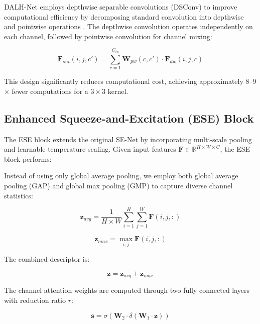 \documentclass[default, iicol]{sn-jnl}
\theoremstyle{thmstyleone}%
\theoremstyle{thmstyletwo}%
\theoremstyle{thmstylethree}%
\begin{document}
DALH-Net employs depthwise separable convolutions (DSConv) to improve computational efficiency by decomposing standard convolution into depthwise and pointwise operations \cite{chollet2017xception}. The depthwise convolution operates independently on each channel, followed by pointwise convolution for channel mixing:

\begin{equation}
\mathbf{F}_{out}(i,j,c') = \sum_{c=1}^{C_{in}} \mathbf{W}_{pw}(c,c') \cdot \mathbf{F}_{dw}(i,j,c)
\end{equation}

This design significantly reduces computational cost, achieving approximately 8--9$\times$ fewer computations for a $3 \times 3$ kernel.


\subsection{Enhanced Squeeze-and-Excitation (ESE) Block}

The ESE block extends the original SE-Net \cite{hu2018squeeze} by incorporating multi-scale pooling and learnable temperature scaling. Given input features $\mathbf{F} \in \mathbb{R}^{H \times W \times C}$, the ESE block performs:

Instead of using only global average pooling, we employ both global average pooling (GAP) and global max pooling (GMP) to capture diverse channel statistics:

\begin{equation}
\mathbf{z}_{avg} = \frac{1}{H \times W} \sum_{i=1}^{H}\sum_{j=1}^{W} \mathbf{F}(i,j,:)
\label{eq:gap}
\end{equation}

\begin{equation}
\mathbf{z}_{max} = \max_{i,j} \mathbf{F}(i,j,:)
\label{eq:gmp}
\end{equation}

The combined descriptor is:

\begin{equation}
\mathbf{z} = \mathbf{z}_{avg} + \mathbf{z}_{max}
\label{eq:combined_pool}
\end{equation}


The channel attention weights are computed through two fully connected layers with reduction ratio $r$:

\begin{equation}
\mathbf{s} = \sigma\left(\mathbf{W}_2 \cdot \delta\left(\mathbf{W}_1 \cdot \mathbf{z}\right)\right)
\label{eq:se_weights}
\end{equation}
\end{document}
